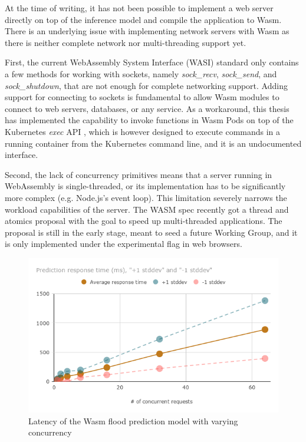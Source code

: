At the time of writing, it has not been possible to implement a web server directly on top of the inference model and compile the application to Wasm. There is an underlying issue with implementing network servers with Wasm as there is neither complete network nor multi-threading support yet.

First, the current WebAssembly System Interface (WASI) standard only contains a few methods for working with sockets, namely \emph{sock\_recv}, \emph{sock\_send}, and \emph{sock\_shutdown}, that are not enough for complete networking support. Adding support for connecting to sockets is fundamental to allow Wasm modules to connect to web servers, databases, or any service. As a workaround, this thesis has implemented the capability to invoke functions in Wasm Pods on top of the Kubernetes \emph{exec} API \cite{k8s-exec}, which is however designed to execute commands in a running container from the Kubernetes command line, and it is an undocumented interface.

Second, the lack of concurrency primitives means that a server running in WebAssembly is single-threaded, or its implementation has to be significantly more complex (e.g. Node.js's event loop). This limitation severely narrows the workload capabilities of the server. The WASM spec recently got a thread and atomics proposal with the goal to speed up multi-threaded applications. The proposal is still in the early stage, meant to seed a future Working Group, and it is only implemented under the experimental flag in web browsers.

\begin{figure}[h]
\centering
\includegraphics[width=\columnwidth]{figures/b-krustlet-4}
\caption{Latency of the Wasm flood prediction model with varying concurrency \label{fig:b-krustlet-4}}
\end{figure}

